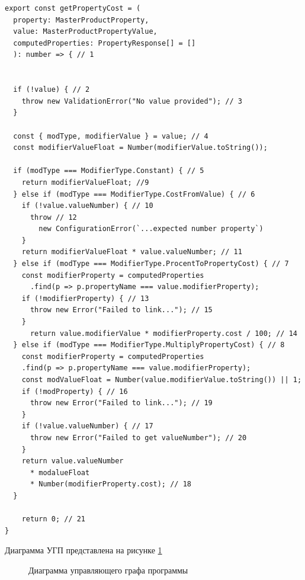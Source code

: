 \documentclass[a4paper,article,14pt]{extarticle}
\begin{document}
\begin{verbatim}
export const getPropertyCost = (
  property: MasterProductProperty,
  value: MasterProductPropertyValue,
  computedProperties: PropertyResponse[] = []
  ): number => { // 1


  if (!value) { // 2
    throw new ValidationError("No value provided"); // 3
  }

  const { modType, modifierValue } = value; // 4
  const modifierValueFloat = Number(modifierValue.toString());

  if (modType === ModifierType.Constant) { // 5
    return modifierValueFloat; //9
  } else if (modType === ModifierType.CostFromValue) { // 6
    if (!value.valueNumber) { // 10
      throw // 12
        new ConfigurationError(`...expected number property`) 
    }
    return modifierValueFloat * value.valueNumber; // 11
  } else if (modType === ModifierType.ProcentToPropertyCost) { // 7
    const modifierProperty = computedProperties
      .find(p => p.propertyName === value.modifierProperty);
    if (!modifierProperty) { // 13
      throw new Error("Failed to link..."); // 15
    }
      return value.modifierValue * modifierProperty.cost / 100; // 14
  } else if (modType === ModifierType.MultiplyPropertyCost) { // 8
    const modifierProperty = computedProperties
    .find(p => p.propertyName === value.modifierProperty);
    const modValueFloat = Number(value.modifierValue.toString()) || 1;
    if (!modProperty) { // 16
      throw new Error("Failed to link..."); // 19
    }
    if (!value.valueNumber) { // 17
      throw new Error("Failed to get valueNumber"); // 20
    }
    return value.valueNumber 
      * modalueFloat 
      * Number(modifierProperty.cost); // 18
  }
    
    return 0; // 21
} 
\end{verbatim}

Диаграмма УГП представлена на рисунке \ref{tpo2ugp}

\begin{figure}[ht]
\begin{center}
\caption{\label{tpo2ugp} Диаграмма управляющего графа программы}
\end {center}
\end {figure}
\end{document}
